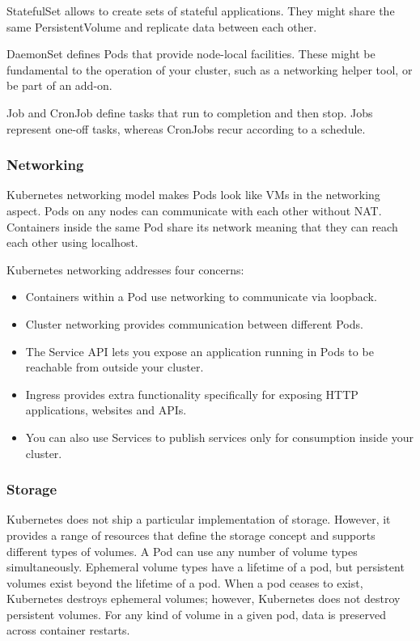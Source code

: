 StatefulSet allows to create sets of stateful applications. They might share the same PersistentVolume and replicate data between each other.

DaemonSet defines Pods that provide node-local facilities. These might be fundamental to the operation of your cluster, such as a networking helper tool, or be part of an add-on.

Job and CronJob define tasks that run to completion and then stop. Jobs represent one-off tasks, whereas CronJobs recur according to a schedule.

\subsubsection*{Networking}

Kubernetes networking model makes Pods look like VMs in the networking aspect. Pods on any nodes can communicate with each other without NAT. Containers inside the same Pod share its network meaning that they can reach each other using localhost.

Kubernetes networking addresses four concerns:
\begin{itemize}
\item Containers within a Pod use networking to communicate via loopback.
\item Cluster networking provides communication between different Pods.
\item The Service API lets you expose an application running in Pods to be reachable from outside your cluster.
\item Ingress provides extra functionality specifically for exposing HTTP applications, websites and APIs.
\item You can also use Services to publish services only for consumption inside your cluster.
\end{itemize}

\subsubsection*{Storage}

Kubernetes does not ship a particular implementation of storage. However, it provides a range of resources that define the storage concept and supports different types of volumes. A Pod can use any number of volume types simultaneously. Ephemeral volume types have a lifetime of a pod, but persistent volumes exist beyond the lifetime of a pod. When a pod ceases to exist, Kubernetes destroys ephemeral volumes; however, Kubernetes does not destroy persistent volumes. For any kind of volume in a given pod, data is preserved across container restarts.

